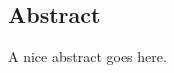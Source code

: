 %
%

\begin{center}

\subsection*{Abstract}

\end{center}

\noindent
A nice abstract goes here.
    
    